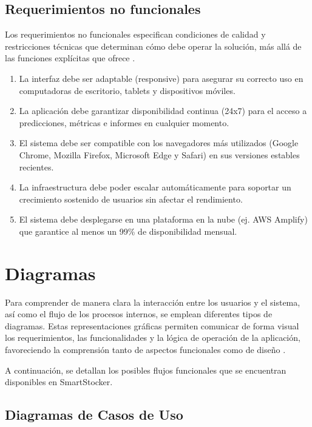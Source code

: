 \subsection{Requerimientos no funcionales}\label{sec:requerimientos-no-funcionales}
Los requerimientos no funcionales especifican condiciones de calidad y restricciones técnicas que determinan cómo debe operar la solución, más allá de las funciones explícitas que ofrece \parencite{ieee2008}.
\begin{enumerate}[label=\textbf{RNF\arabic*}, leftmargin=2.8cm]
    \item La interfaz debe ser adaptable (responsive) para asegurar su correcto uso en computadoras de escritorio, tablets y dispositivos móviles.
    \item La aplicación debe garantizar disponibilidad continua (24x7) para el acceso a predicciones, métricas e informes en cualquier momento.
    \item El sistema debe ser compatible con los navegadores más utilizados (Google Chrome, Mozilla Firefox, Microsoft Edge y Safari) en sus versiones estables recientes.
    \item La infraestructura debe poder escalar automáticamente para soportar un crecimiento sostenido de usuarios sin afectar el rendimiento.
    \item El sistema debe desplegarse en una plataforma en la nube (ej. AWS Amplify) que garantice al menos un 99\% de disponibilidad mensual.
\end{enumerate}

\section{Diagramas}\label{sec:diagramas}

Para comprender de manera clara la interacción entre los usuarios y el sistema, así como el flujo de los procesos internos, se emplean diferentes tipos de diagramas. Estas representaciones gráficas permiten comunicar de forma visual los requerimientos, las funcionalidades y la lógica de operación de la aplicación, favoreciendo la comprensión tanto de aspectos funcionales como de diseño \parencite{booch2005uml}. 

A continuación, se detallan los posibles flujos funcionales que se encuentran disponibles en SmartStocker.

\subsection{Diagramas de Casos de Uso}\label{sec:diagramas-casos-uso}

